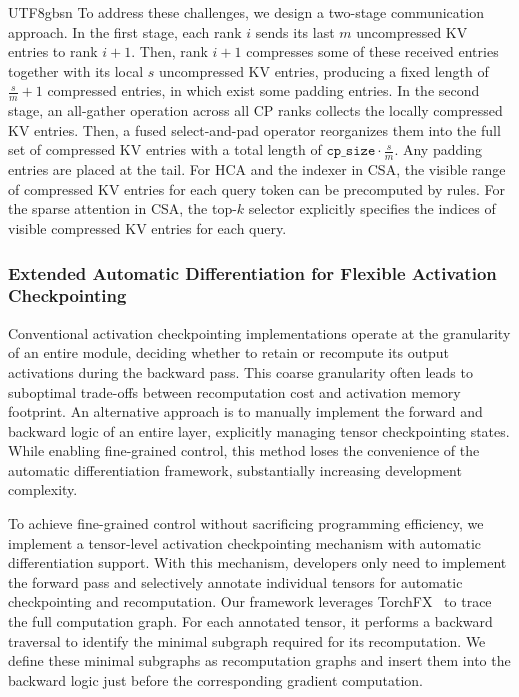 \documentclass[11pt, a4paper, logo, copyright, nonumbering]{deepseek}
\newcommand{\hca}{HCA}
\newcommand{\csa}{CSA}
\begin{document}
\begin{CJK*}{UTF8}{gbsn}
To address these challenges, we design a two-stage communication approach. 
In the first stage, each rank $i$ sends its last $m$ uncompressed KV entries to rank $i+1$. 
Then, rank $i+1$ compresses some of these received entries together with its local $s$ uncompressed KV entries, producing a fixed length of $\frac{s}{m}+1$ compressed entries, in which exist some padding entries. 
In the second stage, an all-gather operation across all CP ranks collects the locally compressed KV entries. 
Then, a fused select-and-pad operator reorganizes them into the full set of compressed KV entries with a total length of $\texttt{cp\_size} \cdot \frac{s}{m}$. 
Any padding entries are placed at the tail.  
For \hca{} and the indexer in \csa{}, the visible range of compressed KV entries for each query token can be precomputed by rules. 
For the sparse attention in \csa{}, the top-$k$ selector explicitly specifies the indices of visible compressed KV entries for each query.

\subsubsection{Extended Automatic Differentiation for Flexible Activation Checkpointing}
Conventional activation checkpointing implementations operate at the granularity of an entire module, deciding whether to retain or recompute its output activations during the backward pass.
This coarse granularity often leads to suboptimal trade-offs between recomputation cost and activation memory footprint. 
An alternative approach is to manually implement the forward and backward logic of an entire layer, explicitly managing tensor checkpointing states. 
While enabling fine-grained control, this method loses the convenience of the automatic differentiation framework, substantially increasing development complexity.

To achieve fine-grained control without sacrificing programming efficiency, we implement a tensor-level activation checkpointing mechanism with automatic differentiation support. 
With this mechanism, developers only need to implement the forward pass and selectively annotate individual tensors for automatic checkpointing and recomputation. 
Our framework leverages TorchFX~\citep{torchfx} to trace the full computation graph.
For each annotated tensor, it performs a backward traversal to identify the minimal subgraph required for its recomputation. 
We define these minimal subgraphs as recomputation graphs and insert them into the backward logic just before the corresponding gradient computation.


\end{CJK*}
\end{document}

